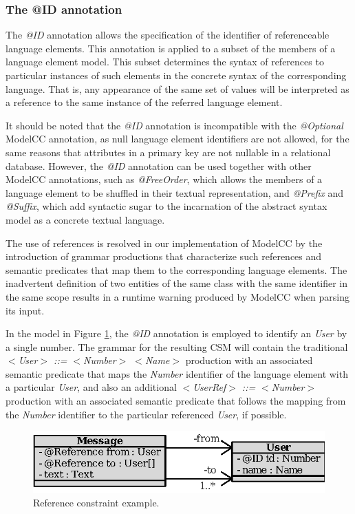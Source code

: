 \documentclass[a4paper,twoside,onecolumn]{article}
\newcommand{\etexttt}[1]{\textit{#1}}
\newcommand{\an}[1]{\emph{#1}} %
\begin{document}
\subsubsection{The @ID annotation}

The \an{@ID} annotation allows the specification of the identifier of referenceable language elements.
This annotation is applied to a subset of the members of a language element model.
This subset determines the syntax of references to particular instances of such elements in the concrete syntax of the corresponding language.
That is, any appearance of the same set of values will be interpreted as a reference to the same instance of the referred language element.

It should be noted that the \an{@ID} annotation is incompatible with the \an{@Optional} ModelCC annotation, as null language element identifiers are not allowed, for the same reasons that attributes in a primary key are not nullable in a relational database.
However, the \an{@ID} annotation can be used together with other ModelCC annotations, such as \an{@FreeOrder}, which allows the members of a language element to be shuffled in their textual representation, and \an{@Prefix} and \an{@Suffix}, which add syntactic sugar to the incarnation of the abstract syntax model as a concrete textual language.

The use of references is resolved in our implementation of ModelCC by the introduction of grammar productions that characterize such references and semantic predicates that map them to the corresponding language elements.
The inadvertent definition of two entities of the same class with the same identifier in the same scope results in a runtime warning produced by ModelCC when parsing its input.

In the model in Figure \ref{fig:graphuserref}, the \an{@ID} annotation is employed to identify an \emph{User} by a single number. The grammar for the resulting CSM will contain the traditional \etexttt{$<$User$>$ ::= $<$Number$>$ $<$Name$>$} production with an associated semantic predicate that maps the \emph{Number} identifier of the language element with a particular \emph{User}, and also an additional \etexttt{$<$UserRef$>$ ::= $<$Number$>$} production with an associated semantic predicate that follows the mapping from the \emph{Number} identifier to the particular referenced \emph{User}, if possible.

\begin{figure}[tb!]
\centering
\includegraphics[scale=1]{msg.eps}
\caption{Reference constraint example.}
\label{fig:graphuserref}
\end{figure}
\end{document}
